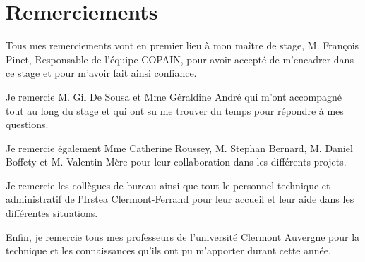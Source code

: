 \pagebreak
\thispagestyle{empty}
\hspace{0pt}
\vfill
\section{Remerciements}
\begin{em}
Tous mes remerciements vont en premier lieu à mon maître de stage, M. François Pinet, Responsable de l'équipe COPAIN, pour avoir accepté de m'encadrer dans ce stage et pour m'avoir fait ainsi confiance.

Je remercie  M. Gil De Sousa et Mme Géraldine André qui m'ont accompagné tout au long du stage et qui ont su me trouver du temps pour répondre à mes questions.

Je remercie également Mme Catherine Roussey, M. Stephan Bernard, M. Daniel Boffety et M. Valentin Mère pour leur collaboration dans les différents projets.

Je remercie les collègues de bureau ainsi que tout le personnel technique et administratif de l'Irstea Clermont-Ferrand pour leur accueil et leur aide dans les différentes situations.

Enfin, je remercie tous mes professeurs de l'université Clermont Auvergne  pour la technique et les connaissances qu’ils ont pu m’apporter durant cette année.
\end{em}

\vfill
\hspace{0pt}
\pagebreak